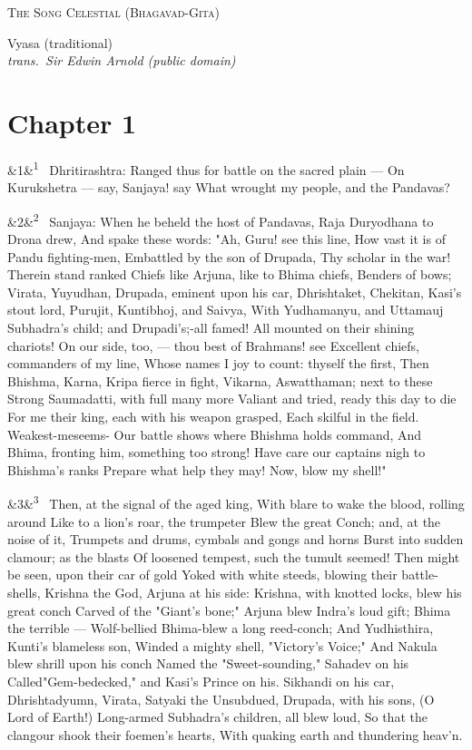 \documentclass[12pt]{article}
\newcommand{\work}[1]{\begin{center}\LARGE\scshape #1\end{center}}
\newcommand{\attrib}[2]{\begin{center}\large #1\\[2pt]\small\itshape trans.\ #2\end{center}\vspace{1em}}
\newcommand{\para}[1][]{\par\noindent\ifx&#1&\else\textsuperscript{\footnotesize #1}~\fi}
\begin{document}
\work{The Song Celestial (Bhagavad-Gita)}
\attrib{Vyasa (traditional)}{Sir Edwin Arnold (public domain)}

\section*{Chapter 1}

\para[1] Dhritirashtra: Ranged thus for battle on the sacred plain --- On Kurukshetra --- say, Sanjaya! say What wrought my people, and the Pandavas?

\para[2] Sanjaya: When he beheld the host of Pandavas, Raja Duryodhana to Drona drew, And spake these words: "Ah, Guru! see this line, How vast it is of Pandu fighting-men, Embattled by the son of Drupada, Thy scholar in the war! Therein stand ranked Chiefs like Arjuna, like to Bhima chiefs, Benders of bows; Virata, Yuyudhan, Drupada, eminent upon his car, Dhrishtaket, Chekitan, Kasi's stout lord, Purujit, Kuntibhoj, and Saivya, With Yudhamanyu, and Uttamauj Subhadra's child; and Drupadi's;-all famed! All mounted on their shining chariots! On our side, too, --- thou best of Brahmans! see Excellent chiefs, commanders of my line, Whose names I joy to count: thyself the first, Then Bhishma, Karna, Kripa fierce in fight, Vikarna, Aswatthaman; next to these Strong Saumadatti, with full many more Valiant and tried, ready this day to die For me their king, each with his weapon grasped, Each skilful in the field. Weakest-meseems- Our battle shows where Bhishma holds command, And Bhima, fronting him, something too strong! Have care our captains nigh to Bhishma's ranks Prepare what help they may! Now, blow my shell!"

\para[3] Then, at the signal of the aged king, With blare to wake the blood, rolling around Like to a lion's roar, the trumpeter Blew the great Conch; and, at the noise of it, Trumpets and drums, cymbals and gongs and horns Burst into sudden clamour; as the blasts Of loosened tempest, such the tumult seemed! Then might be seen, upon their car of gold Yoked with white steeds, blowing their battle-shells, Krishna the God, Arjuna at his side: Krishna, with knotted locks, blew his great conch Carved of the "Giant's bone;" Arjuna blew Indra's loud gift; Bhima the terrible --- Wolf-bellied Bhima-blew a long reed-conch; And Yudhisthira, Kunti's blameless son, Winded a mighty shell, "Victory's Voice;" And Nakula blew shrill upon his conch Named the "Sweet-sounding," Sahadev on his Called"Gem-bedecked," and Kasi's Prince on his. Sikhandi on his car, Dhrishtadyumn, Virata, Satyaki the Unsubdued, Drupada, with his sons, (O Lord of Earth!) Long-armed Subhadra's children, all blew loud, So that the clangour shook their foemen's hearts, With quaking earth and thundering heav'n.
\end{document}
